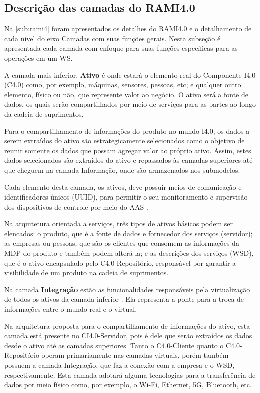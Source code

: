 \subsection{Descrição das camadas do RAMI4.0}

	Na \autoref{sub:rami4} foram apresentados os detalhes do RAMI4.0 e o detalhamento de cada nível do eixo Camadas com suas funções gerais. Nesta subseção é apresentada cada camada com enfoque para suas funções específicas para as operações em um WS.

	A camada mais inferior, \textbf{Ativo} é onde estará o elemento real do Componente I4.0 (C4.0) como, por exemplo, máquinas, sensores, pessoas, etc; e qualquer outro elemento, físico ou não, que represente valor ao negócio. O ativo será a fonte de dados, os quais serão compartilhados por meio de serviços para as partes ao longo da cadeia de suprimentos.
	
	Para o compartilhamento de informações do produto no mundo I4.0, os dados a serem extraídos do ativo são estrategicamente selecionados como o objetivo de reunir somente os dados que possam agregar valor ao próprio ativo. Assim, estes dados selecionados são extraídos do ativo e repassados às camadas superiores até que cheguem na camada Informação, onde são armazenados nos submodelos.
	
	Cada elemento desta camada, os ativos, deve possuir meios de comunicação e identificadores únicos (UUID), para permitir o seu monitoramento e supervisão dos dispositivos de controle por meio do AAS \cite{adolphs2015rami}.
	
	Na arquitetura orientada a serviços, três tipos de ativos básicos podem ser elencados: o produto, que é a fonte de dados e fornecedor dos serviços (servidor); as empresas ou pessoas, que são os clientes que consomem as informações da MDP do produto e também podem alterá-la; e as descrições dos serviços (WSD), que é o ativo encapsulado pelo C4.0-Repositório, responsável por garantir a visibilidade de um produto na cadeia de suprimentos.
	
	Na camada \textbf{Integração} estão as funcionalidades responsáveis pela virtualização de todos os ativos da camada inferior \cite{adolphs2015rami}. Ela representa a ponte para a troca de informações entre o mundo real e o virtual.
	
	Na arquitetura proposta para o compartilhamento de informações do ativo, esta camada está presente no CI4.0-Servidor, pois é dele que serão extraídos os dados desde o ativo até as camadas superiores. Tanto o C4.0-Cliente quanto o C4.0-Repositório operam primariamente nas camadas virtuais, porém também possuem a camada Integração, que faz a conexão com a empresa e o WSD, respectivamente. Esta camada adotará alguma tecnologias para a transferência de dados por meio físico como, por exemplo, o Wi-Fi, Ethernet, 5G, Bluetooth, etc.
	
